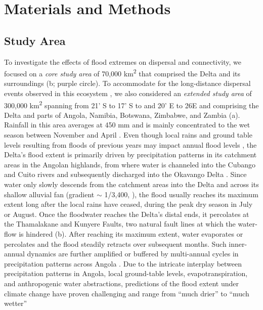 \documentclass[abstract=on,10pt,a4paper,bibliography=totocnumbered]{article}
\begin{document}
\section{Materials and Methods}

\subsection{Study Area}

To investigate the effects of flood extremes on dispersal and connectivity, we
focused on a \textit{core study area} of 70,000 km\textsuperscript{2} that
comprised the Delta and its surroundings (b; purple circle). To
accommodate for the long-distance dispersal events observed in this ecosystem
\citep{Cozzi.2020, Hofmann.2021, Cozzi.2023}, we also considered an
\textit{extended study area} of  300,000 km\textsuperscript{2} spanning from
21' S to 17' S to and 20' E to 26\degree E and
comprising the Delta and parts of Angola, Namibia, Botswana, Zimbabwe, and
Zambia (a). Rainfall in this area averages at 450 mm and is
mainly concentrated to the wet season between November and April
\citep{Mendelsohn.2004}. Even though local rains and ground table levels
resulting from floods of previous years may impact annual flood levels
\citep{McCarthy.2006}, the Delta's flood extent is primarily driven by
precipitation patterns in its catchment areas in the Angolan highlands, from
where water is channeled into the Cubango and Cuito rivers and subsequently
discharged into the Okavango Delta \citep{McCarthy.1997, McCarthy.2003}. Since
water only slowly descends from the catchment areas into the Delta and across
its shallow alluvial fan (gradient $\sim$ 1/3,400, \citealp{McCarthy.1997}), the
flood usually reaches its maximum extent long after the local rains have ceased,
during the peak dry season in July or August. Once the floodwater reaches the
Delta's distal ends, it percolates at the Thamalakane and Kunyere Faults, two
natural fault lines at which the water-flow is hindered (b).
After reaching its maximum extent, water evaporates or percolates and the flood
steadily retracts over subsequent months. Such inner-annual dynamics are further
amplified or buffered by multi-annual cycles in precipitation patterns across
Angola \citep{Wolski.2012}. Due to the intricate interplay between precipitation
patterns in Angola, local ground-table levels, evapotranspiration, and
anthropogenic water abstractions, predictions of the flood extent under climate
change have proven challenging and range from ``much drier'' to ``much wetter''
\end{document}
